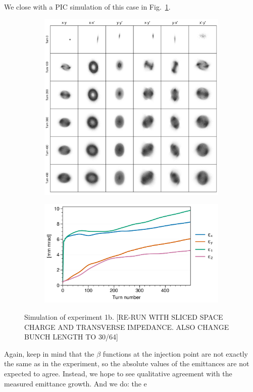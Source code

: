 We close with a PIC simulation of this case in Fig.~\ref{fig:exp1b_sim}. 
%
\begin{figure}[!p]
    \centering
    \begin{subfigure}{0.85\textwidth}
        \includegraphics[width=\textwidth]{Images/chapter5/exp1b/sim_snapshots.png}
    \end{subfigure}
    \vfill
    \vspace*{1.0cm}
    \vfill
    \begin{subfigure}{0.7\textwidth}
        \includegraphics[width=\textwidth]{Images/chapter5/exp1b/sim_emittances.png}
    \end{subfigure}
    \caption{Simulation of experiment 1b. [RE-RUN WITH SLICED SPACE CHARGE AND TRANSVERSE IMPEDANCE. ALSO CHANGE BUNCH LENGTH TO 30/64]}
    \label{fig:exp1b_sim}
\end{figure}
%
Again, keep in mind that the $\beta$ functions at the injection point are not exactly the same as in the experiment, so the absolute values of the emittances are not expected to agree. Instead, we hope to see qualitative agreement with the measured emittance growth. And we do: the e 




